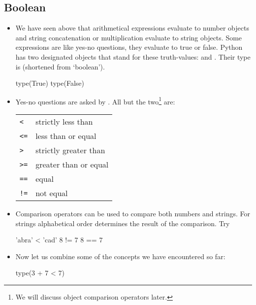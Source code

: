 \documentclass[a4paper]{article}
\begin{document}
\subsection{Boolean}

\begin{itemize}

\item We have seen above that arithmetical expressions evaluate to number
objects and
string concatenation or multiplication evaluate to string objects. Some expressions are
like yes-no questions, they evaluate to true or false. Python has two designated
objects that stand for these truth-values:  and . Their
type is  (shortened from `boolean').

\begin{ucodeframe}
\begin{pyconsole}
type(True)
type(False)
\end{pyconsole}
\end{ucodeframe}

\item Yes-no questions are asked by . All but the
two\footnote{We will discuss object comparison operators later.} are:

\begin{tabular}{ll}
\Verb+<+&	strictly less than\\
\Verb+<=+&	less than or equal\\
\Verb+>+&	strictly greater than\\
\Verb+>=+&	greater than or equal\\
\Verb+==+&	equal\\
\Verb+!=+&	not equal
\end{tabular}

\item Comparison operators can be used to compare both numbers and strings. For
strings alphabetical order determines the result of the comparison. Try

\begin{ucodeframe}
\begin{pyconsole}
'abra' < 'cad'
8 != 7
8 == 7
\end{pyconsole}
\end{ucodeframe}

\item Now let us combine some of the concepts we have encountered so far:

\begin{ucodeframe}
\begin{pyconsole}
type(3 + 7 < 7)
\end{pyconsole}
\end{ucodeframe}


\end{itemize}
\end{document}
